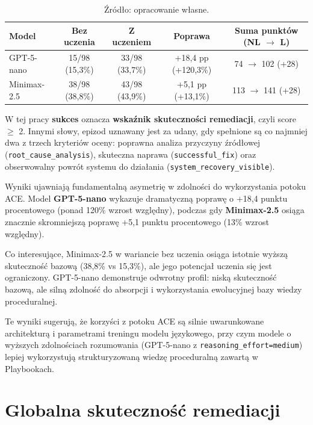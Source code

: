\begin{table}[H]
    \centering
    \caption{Porównanie skuteczności uczenia pomiędzy modelami GPT-5-nano i Minimax-2.5 (n=98 epizodów każdy wariant).}
    \label{tab:model-comparison}
    \footnotesize
    \begin{tabular}{lcccc}
        \hline
        \textbf{Model} & \textbf{Bez uczenia} & \textbf{Z uczeniem} & \textbf{Poprawa} & \textbf{Suma punktów (NL $\rightarrow$ L)} \\
        \hline
        GPT-5-nano & 15/98 (15,3\%) & 33/98 (33,7\%) & +18,4 pp (+120,3\%) & 74 $\rightarrow$ 102 (+28) \\
        Minimax-2.5 & 38/98 (38,8\%) & 43/98 (43,9\%) & +5,1 pp (+13,1\%) & 113 $\rightarrow$ 141 (+28) \\
        \hline
    \end{tabular}
    \caption*{\footnotesize Źródło: opracowanie własne.}
\end{table}

W tej pracy \textbf{sukces} oznacza \textbf{wskaźnik skuteczności remediacji}, czyli score $\geq$ 2. Innymi słowy, epizod uznawany jest za udany, gdy spełnione są co najmniej dwa z trzech kryteriów oceny: poprawna analiza przyczyny źródłowej (\texttt{root\_cause\_analysis}), skuteczna naprawa (\texttt{successful\_fix}) oraz obserwowalny powrót systemu do działania (\texttt{system\_recovery\_visible}).

Wyniki ujawniają fundamentalną asymetrię w zdolności do wykorzystania potoku ACE. Model \textbf{GPT-5-nano} wykazuje dramatyczną poprawę o +18,4 punktu procentowego (ponad 120\% wzrost względny), podczas gdy \textbf{Minimax-2.5} osiąga znacznie skromniejszą poprawę +5,1 punktu procentowego (13\% wzrost względny). 

Co interesujące, Minimax-2.5 w wariancie bez uczenia osiąga istotnie wyższą skuteczność bazową (38,8\% vs 15,3\%), ale jego potencjał uczenia się jest ograniczony. GPT-5-nano demonstruje odwrotny profil: niską skuteczność bazową, ale silną zdolność do absorpcji i wykorzystania ewolucyjnej bazy wiedzy proceduralnej.

Te wyniki sugerują, że korzyści z potoku ACE są silnie uwarunkowane architekturą i parametrami treningu modelu językowego, przy czym modele o wyższych zdolnościach rozumowania (GPT-5-nano z \texttt{reasoning\_effort=medium}) lepiej wykorzystują strukturyzowaną wiedzę proceduralną zawartą w Playbookach.

\section{Globalna skuteczność remediacji}

